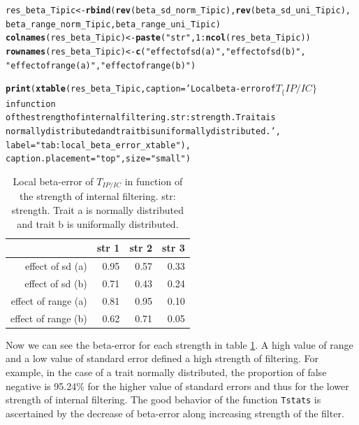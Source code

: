\documentclass[12pt]{article}\usepackage[]{graphicx}\usepackage[]{color}
\makeatletter
\newcommand{\hlnum}[1]{\textcolor[rgb]{0.686,0.059,0.569}{#1}}%
\newcommand{\hlstr}[1]{\textcolor[rgb]{0.192,0.494,0.8}{#1}}%
\newcommand{\hlopt}[1]{\textcolor[rgb]{0,0,0}{#1}}%
\newcommand{\hlstd}[1]{\textcolor[rgb]{0.345,0.345,0.345}{#1}}%
\newcommand{\hlkwb}[1]{\textcolor[rgb]{0.69,0.353,0.396}{#1}}%
\newcommand{\hlkwc}[1]{\textcolor[rgb]{0.333,0.667,0.333}{#1}}%
\newcommand{\hlkwd}[1]{\textcolor[rgb]{0.737,0.353,0.396}{\textbf{#1}}}%
\newenvironment{kframe}{%
 \def\at@end@of@kframe{}%
 \ifinner\ifhmode%
  \def\at@end@of@kframe{\end{minipage}}%
  \begin{minipage}{\columnwidth}%
 \fi\fi%
 \def\FrameCommand##1{\hskip\@totalleftmargin \hskip-\fboxsep
 \colorbox{shadecolor}{##1}\hskip-\fboxsep
     \hskip-\linewidth \hskip-\@totalleftmargin \hskip\columnwidth}%
 \MakeFramed {\advance\hsize-\width
   \@totalleftmargin\z@ \linewidth\hsize
   \@setminipage}}%
 {\par\unskip\endMakeFramed%
 \at@end@of@kframe}
\newenvironment{knitrout}{}{} %
\makeatother
\begin{document}
\begin{knitrout}
\begin{kframe}
\begin{alltt}
\hlstd{res_beta_Tipic} \hlkwb{<-} \hlkwd{rbind}\hlstd{(}\hlkwd{rev}\hlstd{(beta_sd_norm_Tipic),} \hlkwd{rev}\hlstd{(beta_sd_uni_Tipic),}
      \hlstd{beta_range_norm_Tipic, beta_range_uni_Tipic)}
\hlkwd{colnames}\hlstd{(res_beta_Tipic)} \hlkwb{<-} \hlkwd{paste}\hlstd{(}\hlstr{"str"}\hlstd{,} \hlnum{1}\hlopt{:}\hlkwd{ncol}\hlstd{(res_beta_Tipic))}
\hlkwd{rownames}\hlstd{(res_beta_Tipic)} \hlkwb{<-} \hlkwd{c}\hlstd{(}\hlstr{"effect of sd (a)"}\hlstd{,} \hlstr{"effect of sd (b)"}\hlstd{,}
        \hlstr{"effect of range (a)"}\hlstd{,} \hlstr{"effect of range (b)"}\hlstd{)}
\end{alltt}
\end{kframe}
\end{knitrout}

\begin{kframe}
\begin{alltt}
\hlkwd{print}\hlstd{(}\hlkwd{xtable}\hlstd{(res_beta_Tipic,} \hlkwc{caption} \hlstd{=} \hlstr{'Local beta-error of $T_\{IP/IC\}$ in function 
             of the strength of internal filtering. str: strength. Trait a is 
             normally distributed and trait b is uniformally distributed.'}\hlstd{,}
             \hlkwc{label} \hlstd{=} \hlstr{"tab:local_beta_error_xtable"}\hlstd{),}
      \hlkwc{caption.placement} \hlstd{=} \hlstr{"top"}\hlstd{,} \hlkwc{size} \hlstd{=} \hlstr{"small"}\hlstd{)}
\end{alltt}
\end{kframe}%
\begin{table}[ht]
\centering
\caption{Local beta-error of $T_{IP/IC}$ in function 
             of the strength of internal filtering. str: strength. Trait a is 
             normally distributed and trait b is uniformally distributed.} 
\label{tab:local_beta_error_xtable}
{\small
\begin{tabular}{rrrr}
  \hline
 & str 1 & str 2 & str 3 \\ 
  \hline
effect of sd (a) & 0.95 & 0.57 & 0.33 \\ 
  effect of sd (b) & 0.71 & 0.43 & 0.24 \\ 
  effect of range (a) & 0.81 & 0.95 & 0.10 \\ 
  effect of range (b) & 0.62 & 0.71 & 0.05 \\ 
   \hline
\end{tabular}
}
\end{table}

 

Now we can see the beta-error for each strength in table \ref{tab:local_beta_error_xtable}. A high value of range and a low value of standard error defined a high strength of filtering. For example, in the case of a trait normally distributed, the proportion of false negative is 95.24\% for the higher value of standard errors and thus for the lower strength of internal filtering. The good behavior of the function \texttt{Tstats} is ascertained by the decrease of beta-error along increasing strength of the filter.
 
\end{document}
